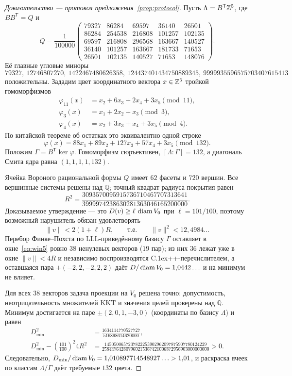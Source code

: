 \begin{proof}[Доказательство --- протокол предложения~\ref{prop:protocol}]
Пусть $\Lambda=B^{\mathsf T}\mathbb{Z}^5$, где $BB^{\mathsf T}=Q$ и
\[
Q=\frac1{100000}
\begin{pmatrix}
79327&86284&69597&36140&26501\\
86284&254538&216808&101257&102135\\
69597&216808&296568&163667&140527\\
36140&101257&163667&181733&71653\\
26501&102135&140527&71653&148076
\end{pmatrix}.
\]
Её главные угловые миноры
\[
79327,\ 12746807270,\ 1422467480626358,\
124437401434750889345,\ 9999935596575703407615413
\]
положительны. Зададим цвет координатного вектора $x\in\mathbb{Z}^5$ тройкой
гомоморфизмов
\[
\begin{aligned}
\varphi_{11}(x)&=x_2+6x_3+2x_4+3x_5\pmod {11},\\
\varphi_3(x)&=x_1+2x_2+x_3\pmod 3,\\
\varphi_4(x)&=x_2+3x_3+x_4+3x_5\pmod 4.
\end{aligned}
\]
По китайской теореме об остатках это эквивалентно одной строке
\[
\varphi(x)=88x_1+89x_2+127x_3+57x_4+3x_5\pmod {132}.
\]
Положим $\Gamma=B^{\mathsf T}\ker\varphi$. Гомоморфизм сюръективен,
$[\Lambda:\Gamma]=132$, а диагональ Смита ядра равна $(1,1,1,1,132)$.

Ячейка Вороного рациональной формы $Q$ имеет $62$ фасеты и $720$ вершин.
Все вершинные системы решены над $\mathbb Q$; точный квадрат радиуса покрытия
равен
\[
R^2=
\frac{3093570095915736710467707313641}
     {3999974238630281363046165200000}.
\]
Доказываемое утверждение --- это $D(v)\ge\ell\,\operatorname{diam} V_0$ при $\ell=101/100$,
поэтому возможный нарушитель обязан удовлетворять
\begin{equation}\label{eq:win5}
\|v\|<2(1+\ell)R,\qquad\text{т.е.}\qquad \|v\|^2<12{,}4984\ldots
\end{equation}
Перебор Финке--Похста \cite{FinckePohst} по LLL-приведённому \cite{LLL}
базису $\Gamma$ оставляет в окне~\eqref{eq:win5} ровно $38$ ненулевых
векторов ($19$ пар); из них $36$ лежат уже в окне $\|v\|<4R$ и независимо
воспроизводятся C\raise.1ex\hbox{\small++}-перечислителем, а оставшаяся пара
$\pm(-2,2,-2,2,2)$ даёт $D/\operatorname{diam} V_0=1{,}0442\ldots$ и на минимум не влияет.

Для всех $38$ векторов задача проекции на $V_0$ решена точно: допустимость,
неотрицательность множителей KKT и значения целей проверены над $\mathbb Q$.
Минимум достигается на паре $\pm(2,0,1,-3,0)$ (координаты по базису
$\Lambda$) и равен
\[
\begin{aligned}
D_{\min}^2&=
\frac{1634114770527727}{516898614620000},\\
D_{\min}^2-\left(\frac{101}{100}\right)^2 4R^2
&=\frac{1450500657237822255902962097875907780124229}
{258447642807960215367421006872956903000000000}>0.
\end{aligned}
\]
Следовательно, $D_{\min}/\operatorname{diam} V_0=1{,}010897714548927\ldots>1{,}01$, и
раскраска ячеек по классам $\Lambda/\Gamma$ даёт требуемые $132$ цвета.
\end{proof}

